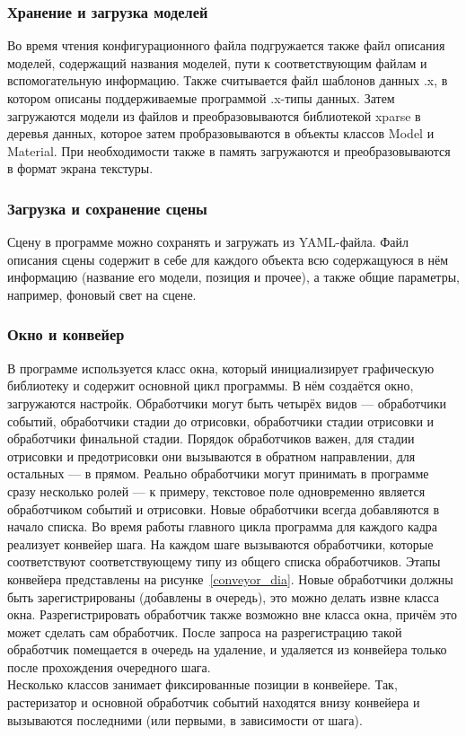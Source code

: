 \documentclass[a4paper,12pt]{report}
\numberwithin{equation}{section}
\begin{document}
\subsubsection{Хранение и загрузка моделей}
Во время чтения конфигурационного файла подгружается также файл описания моделей, содержащий названия моделей, пути к соответствующим файлам и вспомогательную информацию. Также считывается файл шаблонов данных .x, в котором описаны поддерживаемые программой .x-типы данных. Затем загружаются модели из файлов и преобразовываются библиотекой xparse в деревья данных, которое затем пробразовываются в объекты классов Model и Material. При необходимости также в память загружаются и преобразовываются в формат экрана текстуры.

\subsubsection{Загрузка и сохранение сцены}
Сцену в программе можно сохранять и загружать из YAML-файла. Файл описания сцены содержит в себе для каждого объекта всю содержащуюся в нём информацию (название его модели, позиция и прочее), а также общие параметры, например, фоновый свет на сцене.

\subsubsection{Окно и конвейер}
В программе используется класс окна, который инициализирует графическую библиотеку и содержит основной цикл программы. В нём создаётся окно, загружаются настройк. Обработчики могут быть четырёх видов --- обработчики событий, обработчики стадии до отрисовки, обработчики стадии отрисовки и обработчики финальной стадии. Порядок обработчиков важен, для стадии отрисовки и предотрисовки они вызываются в обратном направлении, для остальных --- в прямом. Реально обработчики могут принимать в программе сразу несколько ролей --- к примеру, текстовое поле одновременно является обработчиком событий и отрисовки. Новые обработчики всегда добавляются в начало списка. Во время работы главного цикла программа для каждого кадра реализует конвейер шага. На каждом шаге вызываются обработчики, которые соответствуют соответствующему типу из общего списка обработчиков. Этапы конвейера представлены на рисунке~\ref{conveyor_dia}. Новые обработчики должны быть зарегистрированы (добавлены в очередь), это можно делать извне класса окна. Разрегистрировать обработчик также возможно вне класса окна, причём это может сделать сам обработчик. После запроса на разрегистрацию такой обработчик помещается в очередь на удаление, и удаляется из конвейера только после прохождения очередного шага. \\
Несколько классов занимает фиксированные позиции в конвейере. Так, растеризатор и основной обработчик событий находятся внизу конвейера и вызываются последними (или первыми, в зависимости от шага).
\end{document}
